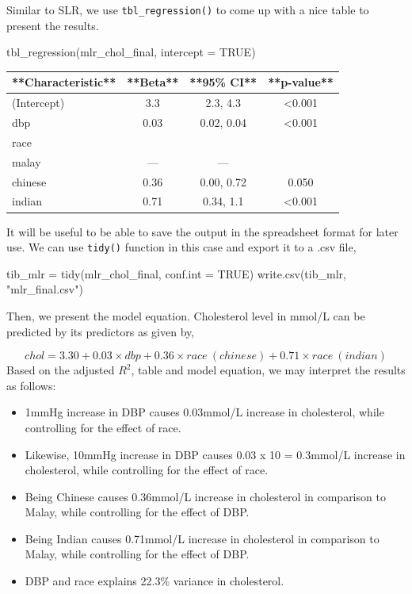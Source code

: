 \documentclass[
  10pt,
]{krantz}
\newenvironment{Shaded}{\begin{snugshade}}{\end{snugshade}}
\newcommand{\AttributeTok}[1]{\textcolor[rgb]{0.77,0.63,0.00}{#1}}
\newcommand{\ConstantTok}[1]{\textcolor[rgb]{0.00,0.00,0.00}{#1}}
\newcommand{\FunctionTok}[1]{\textcolor[rgb]{0.00,0.00,0.00}{#1}}
\newcommand{\NormalTok}[1]{#1}
\newcommand{\OtherTok}[1]{\textcolor[rgb]{0.56,0.35,0.01}{#1}}
\newcommand{\StringTok}[1]{\textcolor[rgb]{0.31,0.60,0.02}{#1}}
\providecommand{\tightlist}{%
  \setlength{\itemsep}{0pt}\setlength{\parskip}{0pt}}
\begin{document}
Similar to SLR, we use \texttt{tbl\_regression()} to come up with a nice table to present the results.

\begin{Shaded}
\begin{Highlighting}[]
\FunctionTok{tbl\_regression}\NormalTok{(mlr\_chol\_final, }\AttributeTok{intercept =} \ConstantTok{TRUE}\NormalTok{)}
\end{Highlighting}
\end{Shaded}

\begin{tabular}{l|c|c|c}
\hline
**Characteristic** & **Beta** & **95\% CI** & **p-value**\\
\hline
(Intercept) & 3.3 & 2.3, 4.3 & <0.001\\
\hline
dbp & 0.03 & 0.02, 0.04 & <0.001\\
\hline
race &  &  & \\
\hline
malay & — & — & \\
\hline
chinese & 0.36 & 0.00, 0.72 & 0.050\\
\hline
indian & 0.71 & 0.34, 1.1 & <0.001\\
\hline
\end{tabular}

It will be useful to be able to save the output in the spreadsheet format for later use. We can use \texttt{tidy()} function in this case and export it to a .csv file,

\begin{Shaded}
\begin{Highlighting}[]
\NormalTok{tib\_mlr }\OtherTok{=} \FunctionTok{tidy}\NormalTok{(mlr\_chol\_final, }\AttributeTok{conf.int =} \ConstantTok{TRUE}\NormalTok{)}
\FunctionTok{write.csv}\NormalTok{(tib\_mlr, }\StringTok{"mlr\_final.csv"}\NormalTok{)}
\end{Highlighting}
\end{Shaded}

Then, we present the model equation. Cholesterol level in mmol/L can be predicted by its predictors as given by,

\[chol = 3.30 + 0.03\times dbp + 0.36\times race\ (chinese) + 0.71\times race\ (indian)\]
Based on the adjusted \(R^2\), table and model equation, we may interpret the results as follows:

\begin{itemize}
\tightlist
\item
  1mmHg increase in DBP causes 0.03mmol/L increase in cholesterol, while controlling for the effect of race.
\item
  Likewise, 10mmHg increase in DBP causes 0.03 x 10 = 0.3mmol/L increase in cholesterol, while controlling for the effect of race.
\item
  Being Chinese causes 0.36mmol/L increase in cholesterol in comparison to Malay, while controlling for the effect of DBP.
\item
  Being Indian causes 0.71mmol/L increase in cholesterol in comparison to Malay, while controlling for the effect of DBP.
\item
  DBP and race explains 22.3\% variance in cholesterol.
\end{itemize}
\end{document}
